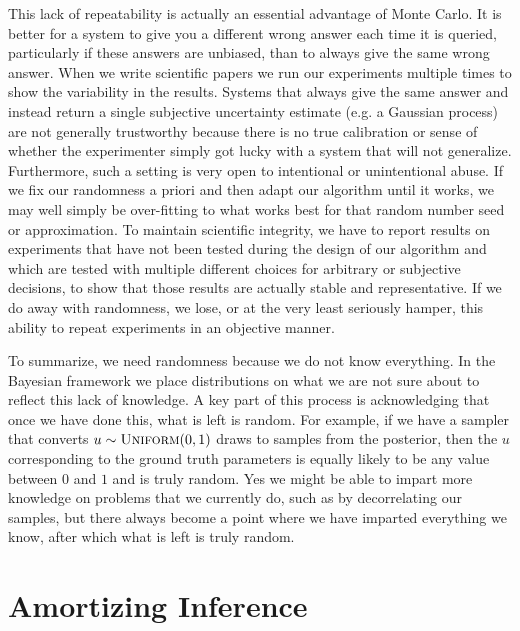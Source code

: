This lack of repeatability is actually an essential advantage of Monte Carlo.  It is better for a system to give you
a different wrong answer each time it is queried, particularly if these answers
are unbiased, than to always give the same wrong answer.  When we write scientific papers we run our experiments
multiple times to show the variability in the results.  Systems that always give the same answer and instead return
a single subjective uncertainty estimate (e.g. a Gaussian process) are not generally trustworthy because there is no
true calibration or sense of whether the experimenter simply got lucky with a system that will not generalize.  
Furthermore, such a setting is very open to intentional or unintentional abuse.  If we fix our randomness
a priori and then adapt our algorithm until it works, we may well simply be over-fitting to what works best for that
random number seed or approximation. To maintain scientific integrity, we have to report results on 
experiments that have not been
tested during the design of our algorithm and which are tested with multiple different choices for arbitrary or subjective
decisions, to show that those results are actually stable and representative.  If we do away with randomness, we lose, or at the very least
seriously hamper, this ability to repeat experiments in an objective manner.

To summarize, we need randomness because we do not know everything.  In the Bayesian framework we place distributions
on what we are not sure about to reflect this lack of knowledge.  A key part of this process is acknowledging that once we
have done this, what is left is random.   For example, if we have a sampler that converts $u\sim\textsc{Uniform}(0,1)$ draws
to samples from the posterior, then the $u$ corresponding to the ground truth parameters is equally likely to be any value
between $0$ and $1$ and is truly random.
Yes we might be able to impart more knowledge on
problems that we currently do, such as by decorrelating our samples, but there always become a point where we have
imparted everything we know, after which what is left is truly random.


\section{Amortizing Inference}

